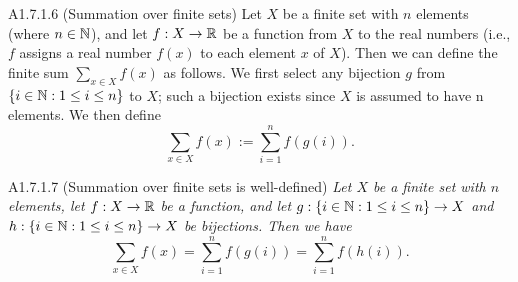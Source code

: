 \begin{definition}{A1.7.1.6}
    (Summation over finite sets) Let $X$ be a finite set with $n$ elements (where
    $n \in \mathbb{N}$), and let $f: X \rightarrow \mathbb{R}$ be a function from $X$
    to the real numbers (i.e., $f$ assigns a real number $f(x)$ to each element
    $x$ of $X$). Then we can define the finite sum $\sum_{x \in X} f(x)$ as follows.
    We first select any bijection $g$ from $\{i \in \mathbb{N} : 1 \leq i \leq n\}$
    to $X$; such a bijection exists since $X$ is assumed to have n elements. We
    then define
    \begin{equation*}
        \sum_{x \in X} f(x) := \sum_{i=1}^{n} f(g(i)).
    \end{equation*}
\end{definition}

\begin{proposition}{A1.7.1.7}
    (Summation over finite sets is well-defined) \emph{Let $X$ be a finite set
    with $n$ elements, let $f: X \rightarrow \mathbb{R}$ be a function, and let $g: \{i \in \mathbb{N} : 1 \leq i \leq n\} \rightarrow X$
    and $h: \{i \in \mathbb{N} : 1 \leq i \leq n\} \rightarrow X$ be bijections.
    Then we have
    \begin{equation*}
        \sum_{x \in X} f(x) = \sum_{i=1}^{n} f(g(i)) = \sum_{i=1}^{n} f(h(i)).
    \end{equation*}}
\end{proposition}

